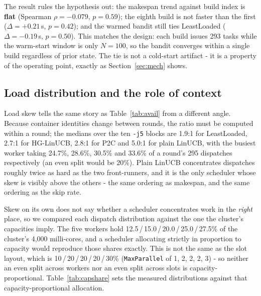 \documentclass[final,5p,times,twocolumn]{elsarticle}
\begin{document}
The result rules the hypothesis out: the makespan trend against build index is \textbf{flat} (Spearman $\rho=-0.079$, $p=0.59$); the eighth build is not faster than the first ($\Delta=+0.21$\,s, $p=0.42$); and the warmed bandit still ties LeastLoaded ($\Delta=-0.19$\,s, $p=0.50$). This matches the design: each build issues 293 tasks while the warm-start window is only $N=100$, so the bandit converges within a single build regardless of prior state. The tie is not a cold-start artifact - it is a property of the operating point, exactly as Section~\ref{sec:mech} shows.

\subsection{Load distribution and the role of context}
\label{sec:skew}

Load skew tells the same story as Table~\ref{tab:avail} from a different angle. Because container identities change between rounds, the ratio must be computed within a round; the medians over the ten \texttt{-j5} blocks are 1.9:1 for LeastLoaded, 2.7:1 for HG-LinUCB, 2.8:1 for P2C and 5.0:1 for plain LinUCB, with the busiest worker taking 24.7\%, 28.6\%, 30.5\% and 33.6\% of a round's 295 dispatches respectively (an even split would be 20\%). Plain LinUCB concentrates dispatches roughly twice as hard as the two front-runners, and it is the only scheduler whose skew is visibly above the others - the same ordering as makespan, and the same ordering as the skip rate.

Skew on its own does not say whether a scheduler concentrates work in the \emph{right} place, so we compared each dispatch distribution against the one the cluster's capacities imply. The five workers hold 12.5\,/\,15.0\,/\,20.0\,/\,25.0\,/\,27.5\% of the cluster's 4{,}000 milli-cores, and a scheduler allocating strictly in proportion to capacity would reproduce those shares exactly. This is not the same as the slot layout, which is 10\,/\,20\,/\,20\,/\,20\,/\,30\% (\texttt{MaxParallel} of 1, 2, 2, 2, 3) - so neither an even split across workers nor an even split across slots is capacity-proportional. Table~\ref{tab:capshare} sets the measured distributions against that capacity-proportional allocation.
\end{document}
